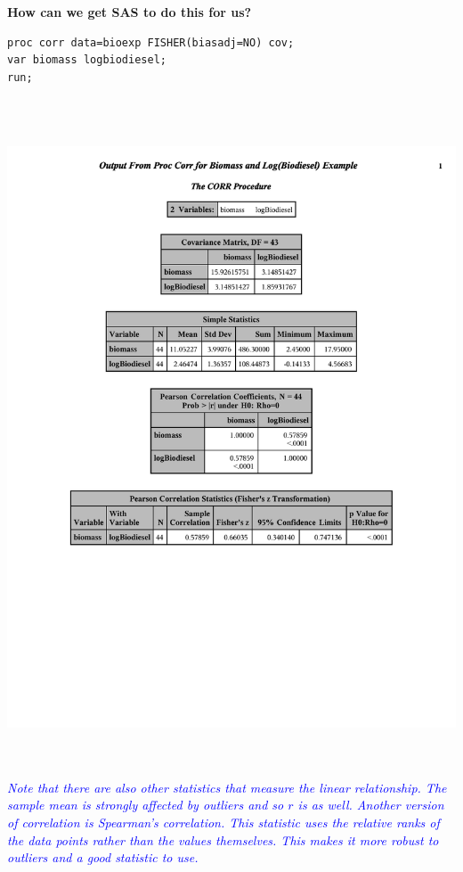 \textbf{How can we get SAS to do this for us?}
\begin{small}
\begin{verbatim}
proc corr data=bioexp FISHER(biasadj=NO) cov;
var biomass logbiodiesel;
run; 
\end{verbatim}
\end{small}
~\\~\\
\begin{center}
\includegraphics[scale=0.75,trim = 0mm 80mm 0mm 10mm]{corrbiodiesel.pdf}\label{corrbio}
\end{center}
~\\~\\
\textit{\textcolor{blue}{Note that there are also other statistics that measure the linear relationship.  The sample mean is strongly affected by outliers and so $r$ is as well.  Another version of correlation is Spearman's correlation.  This statistic uses the relative ranks of the data points rather than the values themselves.  This makes it more robust to outliers and a good statistic to use.}}


